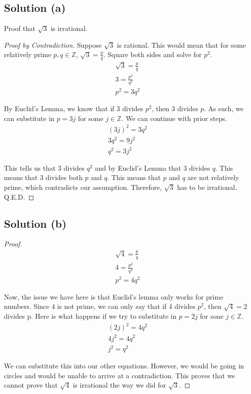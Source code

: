 \documentclass[12pt]{report}
\begin{document}
\subsection{Solution (a)}
Proof that $\sqrt{3}$ is irrational.
\begin{proof}[Proof by Contradiction]
    Suppose $\sqrt{3}$ is rational.
    This would mean that for some relatively prime $p, q \in \mathbb{Z}$, $\sqrt{3} = \frac{p}{q}$.
    Square both sides and solve for $p^2$.
    \begin{gather}
        \sqrt{3} = \frac{p}{q}\\
        3 = \frac{p^2}{q^2}\\
        p^2 = 3q^2
    \end{gather}

    By Euclid's Lemma, we know that if 3 divides $p^2$, then 3 divides $p$.
    As such, we can substitute in $p = 3j$ for some $j \in \mathbb{Z}$.
    We can continue with prior steps.
    \begin{gather}
        (3j)^2 = 3q^2\\
        3q^2 = 9j^2\\
        q^2 = 3j^2
    \end{gather}

    This tells us that 3 divides $q^2$ and by Euclid's Lemma that 3 divides $q$.
    This means that 3 divides both $p$ and $q$. 
    This means that $p$ and $q$ are not relatively prime, which contradicts our assumption.
    Therefore, $\sqrt{3}$ has to be irrational.\\
    Q.E.D.
\end{proof}

\subsection{Solution (b)}
\begin{proof}
    \begin{gather}
        \sqrt{4} = \frac{p}{q}\\
        4 = \frac{p^2}{q^2}\\
        p^2 = 4q^2
    \end{gather}
    
    Now, the issue we have here is that Euclid's lemma only works for prime numbers.
    Since 4 is not prime, we can only say that if 4 divides $p^2$, then $\sqrt{4} = 2$ divides p. 
    Here is what happens if we try to substitute in $p = 2j$ for sone $j \in \mathbb{Z}$.
    \begin{gather}
        (2j)^2  =   4q^2\\
        4j^2    =   4q^2\\
        j^2     =   q^2
    \end{gather}
    
    We can substitute this into our other equations. 
    However, we would be going in circles and would be unable to arrive at a contradiction.
    This proves that we cannot prove that $\sqrt{4}$ is irrational the way we did for $\sqrt{3}$.
\end{proof}
\end{document}
